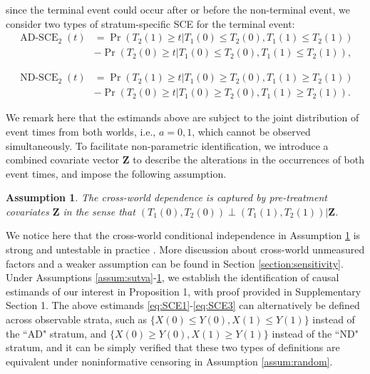 \documentclass[12pt]{article}
\theoremstyle{plain}
\newtheorem{assum}{Assumption}
\def\bfZ{\mathbf{Z}}
\def\Pr{\operatorname{Pr}}
\begin{document}
since the terminal event could occur after or before the non-terminal event, 
we consider two types of stratum-specific SCE for the terminal event:
\begin{equation}
\begin{split}
\operatorname{AD-SCE}_2(t)
&=\Pr(T_2(1)\geq t|T_1(0)\leq T_2(0),T_1(1)\leq T_2(1))\\
&-\Pr(T_2(0)\geq t|T_1(0)\leq T_2(0),T_1(1)\leq T_2(1)),
\label{eq:SCE2}
\end{split}
\end{equation}

\begin{equation}
\begin{split}
\operatorname{ND-SCE}_2(t)
&=\Pr(T_2(1)\geq t|T_1(0)\geq T_2(0),T_1(1)\geq T_2(1))\\
&-\Pr(T_2(0)\geq t|T_1(0)\geq T_2(0),T_1(1)\geq T_2(1)).
\label{eq:SCE3}
\end{split}
\end{equation}


We remark here that the estimands above are subject to the joint distribution of event times from both worlds, i.e., $a=0,1$, which cannot be observed simultaneously. To facilitate non-parametric identification, we introduce a combined covariate vector $\bfZ$ to describe the alterations in the occurrences of both event times, and impose the following assumption. 
\begin{assum}
The cross-world dependence is captured by pre-treatment covariates $\bfZ$ in the sense that $(T_1(0),T_2(0))\perp (T_1(1),T_2(1))|\bfZ$.
\label{assum: covariate}
\end{assum}


We notice here that the cross-world conditional independence in Assumption \ref{assum: covariate} is strong and untestable in practice \citep{richardson2013single,robins2022interventionist,stensrud2021discussion}.
More discussion about cross-world unmeasured factors and a weaker assumption can be found in Section \ref{section:sensitivity}. Under Assumptions \ref{assum:sutva}-\ref{assum: covariate}, we establish the identification of causal estimands of our interest in Proposition 1, with proof provided in Supplementary Section 1. The above estimands \eqref{eq:SCE1}-\eqref{eq:SCE3} can alternatively be defined across observable strata, such as $\{X(0) \leq Y(0), X(1) \leq Y(1)\}$ instead of the ``AD" stratum, and $\{X(0) \geq Y(0), X(1) \geq Y(1)\}$ instead of the ``ND" stratum, and it can be simply verified that these two types of definitions are equivalent under noninformative censoring in Assumption \ref{assum:random}.
\end{document}
